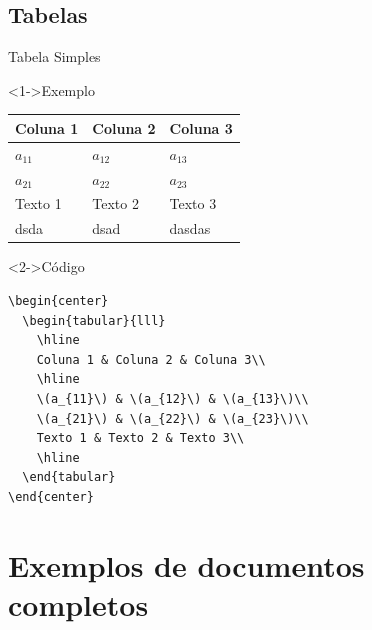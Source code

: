 \documentclass[bigger]{beamer}
\begin{document}
\subsection{Tabelas}
\label{sec:org2f95c72}
\begin{frame}[label={sec:orgeb75ea4},fragile]{Tabela Simples}
 \begin{block}<1->{Exemplo}
\begin{center}
\begin{tabular}{lll}
\hline
Coluna 1 & Coluna 2 & Coluna 3\\
\hline
\(a_{11}\) & \(a_{12}\) & \(a_{13}\)\\
\(a_{21}\) & \(a_{22}\) & \(a_{23}\)\\
Texto 1 & Texto 2 & Texto 3\\
dsda & dsad & dasdas\\
\hline
\end{tabular}
\end{center}
\end{block}

\begin{block}<2->{Código}
\begin{verbatim}
\begin{center}
  \begin{tabular}{lll}
    \hline
    Coluna 1 & Coluna 2 & Coluna 3\\
    \hline
    \(a_{11}\) & \(a_{12}\) & \(a_{13}\)\\
    \(a_{21}\) & \(a_{22}\) & \(a_{23}\)\\
    Texto 1 & Texto 2 & Texto 3\\
    \hline
  \end{tabular}
\end{center}
\end{verbatim}
\end{block}
\end{frame}
\section{Exemplos de documentos completos}
\label{sec:org4767aaf}
\end{document}
